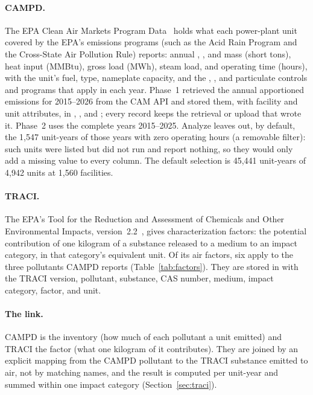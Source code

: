\documentclass[11pt,a4paper]{article}
\begin{document}
\paragraph{CAMPD.} The EPA Clean Air Markets Program Data~\cite{epa2026campd} holds what each
power-plant unit covered by the EPA's emissions programs (such as the Acid Rain Program and the
Cross-State Air Pollution Rule) reports: annual \COtwo{}, \SOtwo{},
and \NOx{} mass (short tons), heat input (MMBtu), gross load (MWh), steam load, and operating
time (hours), with the unit's fuel, type, nameplate capacity, and the \SOtwo{}, \NOx{}, and
particulate controls and programs that apply in each year. Phase~1 retrieved the annual
apportioned emissions for 2015--2026 from the CAM API and stored them, with facility and unit
attributes, in , , and ; every record keeps
the retrieval or upload that wrote it. Phase~2 uses the complete years 2015--2025. Analyze leaves
out, by default, the 1{,}547 unit-years of those years with zero operating hours (a removable
filter): such units were listed but did not run and report nothing, so they would only add a
missing value to every column. The default selection is 45{,}441 unit-years of 4{,}942 units at
1{,}560 facilities.

\paragraph{TRACI.} The EPA's Tool for the Reduction and Assessment of Chemicals and Other
Environmental Impacts, version~2.2~\cite{bare2011traci,epa2022traci22}, gives characterization
factors: the potential contribution of one kilogram of a substance released to a medium to an
impact category, in that category's equivalent unit. Of its air factors, six apply to the three
pollutants CAMPD reports (Table~\ref{tab:factors}). They are stored in  with
the TRACI version, pollutant, substance, CAS number, medium, impact category, factor, and unit.

\paragraph{The link.} CAMPD is the inventory (how much of each pollutant a unit emitted) and TRACI
the factor (what one kilogram of it contributes). They are joined by an explicit mapping from the
CAMPD pollutant to the TRACI substance emitted to air, not by matching names, and the result is
computed per unit-year and summed within one impact category (Section~\ref{sec:traci}).
\end{document}
